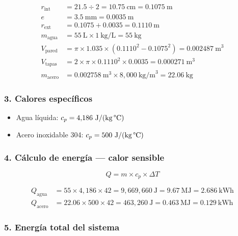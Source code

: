 \begin{align*}
r_{\text{int}} &= 21.5 \div 2 = 10.75~\text{cm} = 0.1075~\text{m} \\
e &= 3.5~\text{mm} = 0.0035~\text{m} \\
r_{\text{ext}} &= 0.1075 + 0.0035 = 0.1110~\text{m} \\
m_{\text{agua}} &= 55~\text{L} \times 1~\text{kg/L} = 55~\text{kg} \\
V_{\text{pared}} &= \pi \times 1.035 \times (0.1110^2 - 0.1075^2) = 0.002487~\text{m}^3 \\
V_{\text{tapas}} &= 2 \times \pi \times 0.1110^2 \times 0.0035 = 0.000271~\text{m}^3 \\
m_{\text{acero}} &= 0.002758~\text{m}^3 \times 8{,}000~\text{kg/m}^3 = 22.06~\text{kg}
\end{align*}

\subsubsection*{3. Calores específicos}

\begin{itemize}
  \item Agua líquida: $c_p = 4{,}186~\text{J/(kg\,\textdegree C)}$ \cite{Cengel2019}
  \item Acero inoxidable 304: $c_p = 500~\text{J/(kg\,\textdegree C)}$ \cite{ASMHandbook}
\end{itemize}

\subsubsection*{4. Cálculo de energía — calor sensible}

\[Q = m \times c_p \times \Delta T\]

\begin{align*}
Q_{\text{agua}}  &= 55 \times 4{,}186 \times 42 = 9{,}669{,}660~\text{J} = 9.67~\text{MJ} = 2.686~\text{kWh} \\
Q_{\text{acero}} &= 22.06 \times 500 \times 42 = 463{,}260~\text{J} = 0.463~\text{MJ} = 0.129~\text{kWh}
\end{align*}

\subsubsection*{5. Energía total del sistema}

